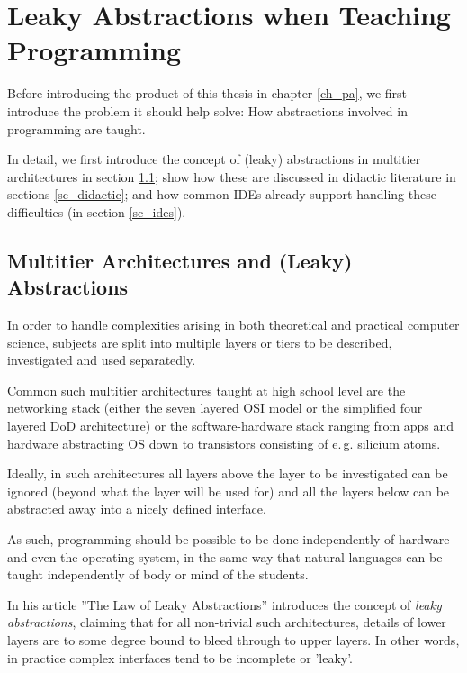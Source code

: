 
\chapter{Leaky Abstractions when Teaching Programming} \label{ch_theory}

Before introducing the product of this thesis in chapter \ref{ch_pa}, we first introduce the problem it should help solve: How abstractions involved in programming are taught.

In detail, we first introduce the concept of (leaky) abstractions in multitier architectures in section \ref{sc_abstractions}; show how these are discussed in didactic literature in sections \ref{sc_didactic}; and how common IDEs already support handling these difficulties (in section \ref{sc_ides}).


\section{Multitier Architectures and (Leaky) Abstractions} \label{sc_abstractions}
In order to handle complexities arising in both theoretical and practical computer science, subjects are split into multiple layers or tiers to be described, investigated and used separatedly. 

Common such multitier architectures taught at high school level are the networking stack (either the seven layered OSI model or the simplified four layered DoD architecture) or the software-hardware stack ranging from apps and hardware abstracting OS down to transistors consisting of e.\,g. silicium atoms.


Ideally, in such architectures all layers above the layer to be investigated can be ignored (beyond what the layer will be used for) and all the layers below can be abstracted away into a nicely defined interface.

As such, programming should be possible to be done independently of hardware and even the operating system, in the same way that natural languages can be taught independently of body or mind of the students.

In his article ''The Law of Leaky Abstractions'' \citep{Spo02} introduces the concept of \emph{leaky abstractions}, claiming that for all non-trivial such architectures, details of lower layers are to some degree bound to bleed through to upper layers. In other words, in practice complex interfaces tend to be incomplete or 'leaky'.

